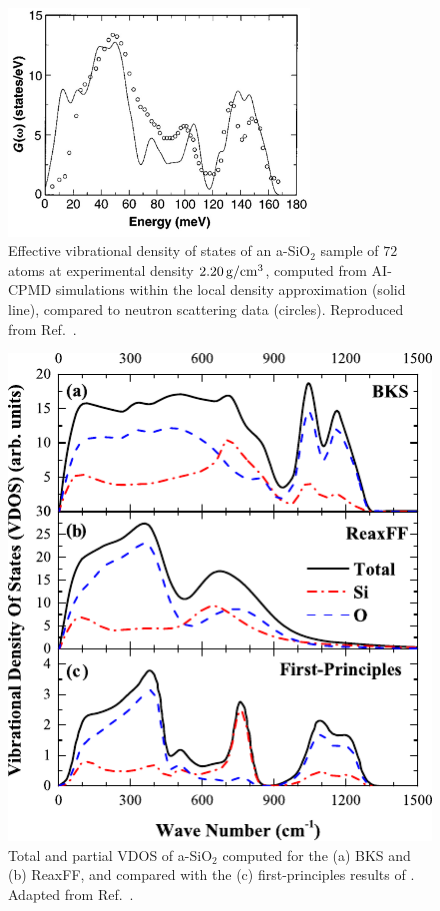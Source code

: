 \begin{figure}[!tb]
    \centering
    \includegraphics[width=8cm]{chapters/chapter6/figures/Sarnthein_Car_abinitio_VDOS_silica-2.jpg}
    \caption{
    Effective vibrational density of states of an a-SiO$_2$ sample of $72$ atoms at experimental density $2.20\,\mathrm{g/cm^3}$, computed from AI-CPMD simulations within the local density approximation (solid line), compared to neutron scattering data (circles). Reproduced from Ref.~\cite{Sarnthein1997}.}
    \label{fig:silica-vdos-abinitio}
\end{figure}
\begin{figure}[!tb]
    \centering
    \includegraphics{chapters/chapter6/figures/Tian_VDOS_silica.pdf}
    \caption{
    Total and partial VDOS of a-SiO$_2$ computed for the (a) BKS and (b) ReaxFF, and compared with the (c) first-principles results of \citet{Bhattarai2016}. Adapted from Ref.~\cite{Tian2017}.}
    \label{fig:silica-vdos-classical}
\end{figure}

